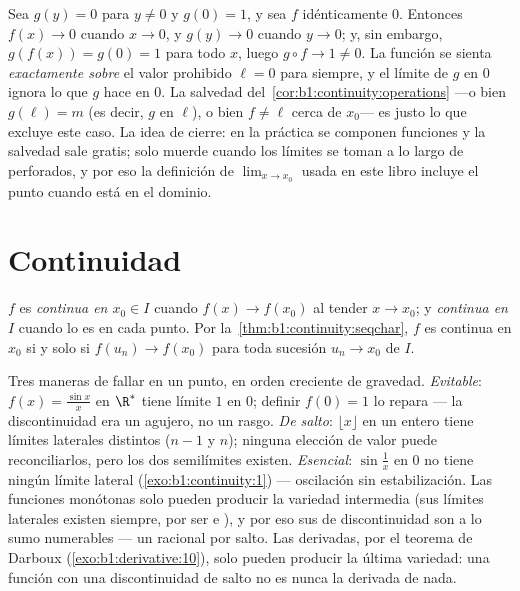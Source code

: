 \begin{example}\label{ex:b1:continuity:compositiontrap}
Sea $g(y) = 0$ para $y \neq 0$ y $g(0) = 1$, y sea $f$ idénticamente
$0$. Entonces $f(x) \to 0$ cuando $x \to 0$, y $g(y) \to 0$ cuando
$y \to 0$; y, sin embargo, $g(f(x)) = g(0) = 1$ para todo $x$, luego
$g \circ f \to 1 \neq 0$. La función  se sienta
\emph{exactamente sobre} el valor prohibido $\ell = 0$ para siempre,
y el límite de $g$ en $0$ ignora lo que $g$ hace en $0$. La salvedad
del~\cref{cor:b1:continuity:operations} ---o bien $g(\ell) = m$ (es
decir, $g$  en $\ell$), o bien $f \neq \ell$ cerca de
$x_0$--- es justo lo que excluye este caso. La idea de cierre: en la
práctica se componen funciones \emph{} y la salvedad sale
gratis; solo muerde cuando los límites se toman a lo largo de
 perforados, y por eso la definición de $\lim_{x \to x_0}$
usada en este libro incluye el punto cuando está en el dominio.
\end{example}

\section{Continuidad}

\begin{definition}\label{def:b1:continuity:continuous}
$f$ es \emph{continua en $x_0 \in I$} cuando
$f(x) \to f(x_0)$ al tender $x \to x_0$; y \emph{continua en $I$}
cuando lo es en cada punto. Por la~\cref{thm:b1:continuity:seqchar},
$f$ es continua en $x_0$ si y solo si $f(u_n) \to f(x_0)$ para toda
sucesión $u_n \to x_0$ de $I$.
\end{definition}

\begin{example}\label{ex:b1:continuity:taxonomy}
Tres maneras de fallar en un punto, en orden creciente de gravedad.
\emph{Evitable}: $f(x) = \frac{\sin x}{x}$ en $\R^*$ tiene límite $1$
en $0$; definir $f(0) = 1$ lo repara --- la discontinuidad era un
agujero, no un rasgo. \emph{De salto}: $\lfloor x \rfloor$ en un
entero tiene límites laterales distintos ($n - 1$ y $n$); ninguna
elección de valor puede reconciliarlos, pero los dos semilímites
existen. \emph{Esencial}: $\sin\frac1x$ en $0$ no tiene ningún límite
lateral (\cref{exo:b1:continuity:1}) --- oscilación sin
estabilización. Las funciones monótonas solo pueden producir la
variedad intermedia (sus límites laterales existen siempre, por ser
 e ), y por eso sus  de discontinuidad son
a lo sumo numerables --- un racional por salto. Las derivadas, por el
teorema de Darboux (\cref{exo:b1:derivative:10}), solo pueden
producir la última variedad: una función con una discontinuidad de
salto no es nunca la derivada de nada.
\end{example}

